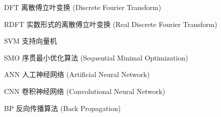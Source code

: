 \begin{denotation}[3cm]
\item[DFT] 离散傅立叶变换 (Discrete Fourier Transform)
\item[RDFT] 实数形式的离散傅立叶变换 (Real Discrete Fourier Transform)
\item[SVM] 支持向量机
\item[SMO] 序贯最小优化算法 (Sequential Minimal Optimization)
\item[ANN] 人工神经网络 (Artificial Neural Network)
\item[CNN] 卷积神经网络 (Convolutional Neural Network)
\item[BP] 反向传播算法 (Back Propagation)
\end{denotation}
